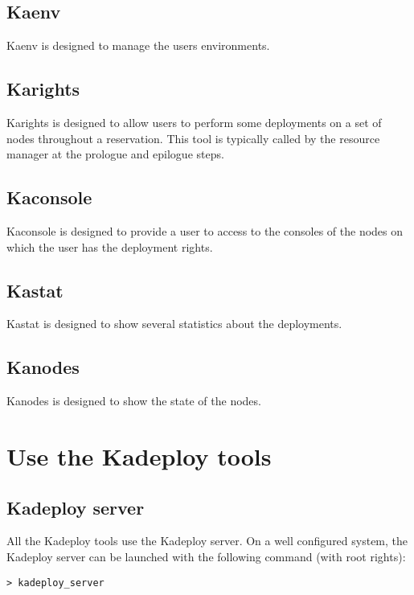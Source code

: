 \documentclass[a4wide,10pt,oneside]{book}
\begin{document}
\subsection{Kaenv}
Kaenv is designed to manage the users environments.

\subsection{Karights}
Karights is designed to allow users to perform some deployments on a set of nodes throughout a reservation. This tool is typically called by the resource manager at the prologue and epilogue steps.

\subsection{Kaconsole}
Kaconsole is designed to provide a user to access to the consoles of the nodes on which the user has the deployment rights.

\subsection{Kastat}
Kastat is designed to show several statistics about the deployments.

\subsection{Kanodes}
Kanodes is designed to show the state of the nodes.

\section{Use the Kadeploy tools}
\subsection{Kadeploy server}
All the Kadeploy tools use the Kadeploy server. On a well configured system, the Kadeploy server can be launched with the following command (with root rights):
\begin{verbatim}
> kadeploy_server
\end{verbatim}
\end{document}
